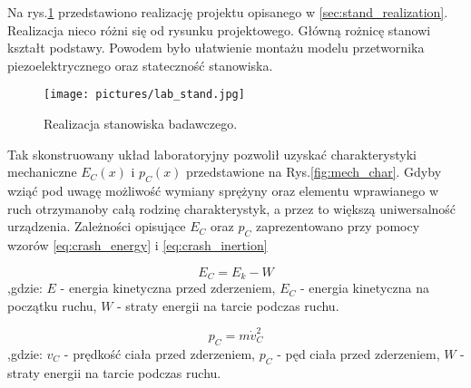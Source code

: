 Na rys.\ref{fig:test_stand_photo} przedstawiono realizację 
projektu opisanego w \ref{sec:stand_realization}. Realizacja nieco różni się od
rysunku projektowego. Główną rożnicę stanowi kształt podstawy. Powodem było ułatwienie
montażu modelu przetwornika piezoelektrycznego oraz stateczność stanowiska. 

\begin{figure}[htbp]
\centering
\texttt{[image: pictures/lab\_stand.jpg]}
\caption{Realizacja stanowiska badawczego.}
\label{fig:test_stand_photo}
\end{figure}

Tak skonstruowany układ laboratoryjny pozwolił uzyskać charakterystyki mechaniczne 
$E_C(x)$ i $p_C(x)$ przedstawione na Rys.\ref{fig:mech_char}. 
Gdyby wziąć pod uwagę możliwość wymiany sprężyny
oraz elementu wprawianego w ruch otrzymanoby całą rodzinę charakterystyk, a przez to
większą uniwersalność urządzenia. Zależności opisujące $E_C$ oraz $p_C$ zaprezentowano
przy pomocy wzorów \ref{eq:crash_energy} i \ref{eq:crash_inertion}


\begin{equation}
  E_C = E_k - W
  \label{eq:crash_energy}
\end{equation}
  ,gdzie: $E$ - energia kinetyczna przed zderzeniem, 
  $E_C$ - energia kinetyczna na początku ruchu,
  $W$ - straty energii na tarcie podczas ruchu.

\begin{equation}
  p_C = m \dot v_C^2
  \label{eq:crash_inertion}
\end{equation}
  ,gdzie: $v_C$ - prędkość ciała przed zderzeniem, 
  $p_C$ - pęd ciała przed zderzeniem,
  $W$ - straty energii na tarcie podczas ruchu.


\pgfplotsset{width=\linewidth,compat=1.3}

